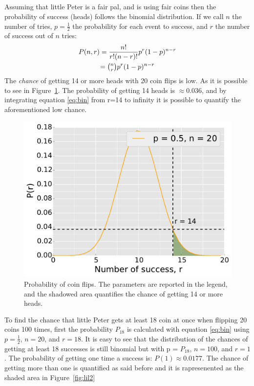 \documentclass[twocolumn]{article}
\begin{document}
	\subsection{} %
	\label{sub:}
	Assuming that little Peter is a fair pal, and is using fair coins then the probability of success (heads) follows the binomial distribution.
	If we call $n$ the number of tries, $p= \frac{1}{2}$ the probability for each event to success, and $r$ the number of success out of $n$ tries:
	\begin{multline}
	\label{eq:bin}
		P (n,r) = \frac{n!}{r!(n-r)!} p ^ r (1-p)^{n-r} \\ 
		 = \tbinom n r p ^ r (1-p)^{n-r}
	\end{multline}
	The \emph{chance} of getting 14 or more heads with 20 coin flips is low. As it is possible to see in Figure~\ref{fig:lil}. The probability of getting 14 heads is $\approx 0.036$, and by integrating equation \ref{eq:bin} from r=14 to infinity it is possible to quantify the aforementioned low chance.
	\begin{figure}[h]
		\begin{center}
			\includegraphics[width=.4\textwidth]{fig/lil.pdf}
		\end{center}
		\caption{Probability of coin flips. The parameters are reported in the legend, and the shadowed area quantifies the chance of getting 14 or more heads.}
		\label{fig:lil}
	\end{figure}


	To find the chance that little Peter gets at least 18 coin at once when flipping 20 coins 100 times, first the probability $P_{18}$ is calculated with equation \ref{eq:bin} using $p= \frac{1}{2}$, $n=20$, and $r=18$.
	It is easy to see that the distribution of the chances of getting at least 18 successes is still binomial but with p = $P_{18}$, $n=100$, and $r=1$.
	The probability of getting one time a success is: $P(1) \approx 0.0177$. The chance of getting more than one is quantified as said before and it is rapresenented as the shaded area in Figure~\ref{fig:lil2}
\end{document}
